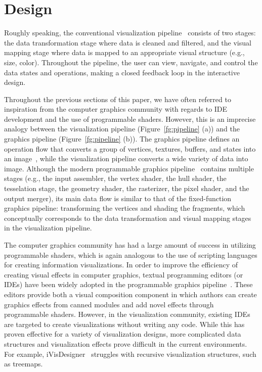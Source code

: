 \section{Design}
\label{sec:design}

Roughly speaking, the conventional visualization pipeline~\cite{Card:1999} consists of two stages: the data transformation stage where data is cleaned and filtered, and the visual mapping stage where data is mapped to an appropriate visual structure (e.g., size, color). Throughout the pipeline, the user can view, navigate, and control the data states and operations, making a closed feedback loop in the interactive design.

Throughout the previous sections of this paper, we have often referred to inspiration from the computer graphics community with regards to IDE development and the use of programmable shaders.  However, this is an imprecise analogy between the visualization pipeline (Figure~\ref{fg:pipeline} (a)) and the graphics pipeline (Figure~\ref{fg:pipeline} (b)).  The graphics pipeline defines an operation flow that converts a group of vertices, textures, buffers, and states into an image~\cite{RenderMan}, while the visualization pipeline converts a wide variety of data into image.   Although the modern programmable graphics pipeline~\cite{OpenGLSL} contains multiple stages (e.g., the input assembler, the vertex shader, the hull shader, the tesselation stage, the geometry shader, the rasterizer, the pixel shader, and the output merger), its main data flow is similar to that of the fixed-function graphics pipeline: transforming the vertices and shading the fragments, which conceptually corresponds to the data transformation and visual mapping stages in the visualization pipeline.


The computer graphics community has had a large amount of success in utilizing programmable shaders, which is again analogous to the use of scripting languages for creating information visualizations.  In order to improve the efficiency of creating visual effects in computer graphics, textual programming editors (or IDEs) have been widely adopted in the programmable graphics pipeline~\cite{FXComposer,RenderMonkey}.  These editors provide both a visual composition component in which authors can create graphics effects from canned modules and add novel effects through programmable shaders. However, in the visualization community, existing IDEs are targeted to create visualizations without writing any code.  While this has proven effective for a variety of visualization designs, more complicated data structures and visualization effects prove difficult in the current environments.  For example, iVisDesigner~\cite{Yuan:2014:TVCG} struggles with recursive visualization structures, such as treemaps.

